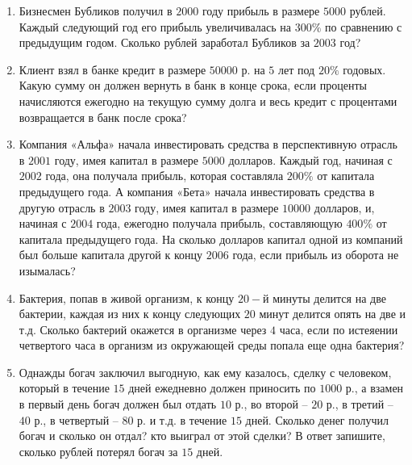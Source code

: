 \documentclass[12pt, a4paper]{article}
\begin{document}
	
	\begin{enumerate}
		\item Бизнесмен Бубликов получил в $2000$ году прибыль в размере $5000$ рублей. Каждый следующий год его прибыль увеличивалась на $300\%$ по сравнению с предыдущим годом. Сколько рублей заработал Бубликов за $2003$ год?
		\item Клиент взял в банке кредит в размере $50 000$ р. на $5$ лет под $20$$\%$ годовых. Какую сумму он должен вернуть в банк в конце срока, если проценты начисляются ежегодно на текущую сумму долга и весь кредит с процентами возвращается в банк после срока?
		 \item Компания «Альфа» начала инвестировать средства в перспективную отрасль в $2001$ году, имея капитал в размере $5000$ долларов. Каждый год, начиная с $2002$ года, она получала прибыль, которая составляла $200\%$ от капитала предыдущего года. А компания «Бета» начала инвестировать средства в другую отрасль в $2003$ году, имея капитал в размере $10000$ долларов, и, начиная с $2004$ года, ежегодно получала прибыль, составляющую $400\%$ от капитала предыдущего года. На сколько долларов капитал одной из компаний был больше капитала другой к концу $2006$ года, если прибыль из оборота не изымалась?
		 \item Бактерия, попав в живой организм, к концу $20-$й минуты делится на две бактерии, каждая из них к концу следующих $20$ минут делится опять на две и т.д. Сколько бактерий окажется в организме через $4$ часа, если по истеяении четвертого часа в организм из окружающей среды попала еще одна бактерия?
		\item Однажды богач заключил выгодную, как ему казалось, сделку с человеком, который в течение $15$ дней ежедневно должен приносить по $1000$ р., а взамен в первый день богач должен был отдать $10$ р., во второй – $20$ р., в третий – $40$ р., в четвертый – $80$ р. и т.д. в течение $15$ дней. Сколько денег получил богач и сколько он отдал? кто выиграл от этой сделки? В ответ запишите, сколько рублей потерял богач за $15$ дней.
	\end{enumerate}
\end{document}
